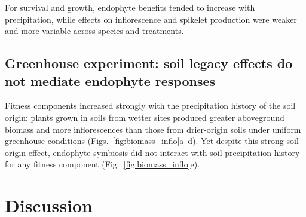 \documentclass[12pt]{article}\usepackage[]{graphicx}\usepackage[dvipsnames]{xcolor}
\begin{document}
For survival and growth, endophyte benefits tended to increase with precipitation, while effects on inflorescence and spikelet production were weaker and more variable across species and treatments. 

\subsection*{Greenhouse experiment: soil legacy effects do not mediate endophyte responses}
Fitness components increased strongly with the precipitation history of the soil origin: plants grown in soils from wetter sites produced greater aboveground
biomass and more inflorescences than those from drier-origin soils under uniform greenhouse conditions (Figs.~\ref{fig:biomass_inflo}a--d). Yet despite this strong soil-origin effect, endophyte symbiosis did not interact with soil precipitation history for any fitness component (Fig.~\ref{fig:biomass_inflo}e).

\section*{Discussion}
\end{document}
